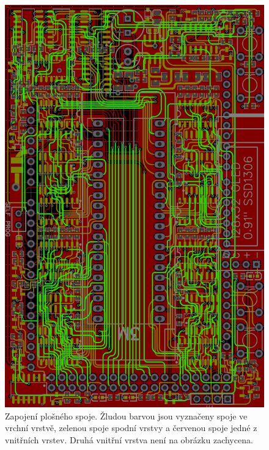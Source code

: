 \documentclass[11pt,a4paper,twoside,openright]{report}
\begin{document}
\begin{figure}[ht!]
  \includegraphics[width=\linewidth]{img/board.png}
  \centering
  \caption{Zapojení plošného spoje. Žludou barvou jsou vyznačeny spoje ve vrchní vrstvě, zelenou spoje spodní vrstvy a červenou spoje jedné z vnitřních vrstev. Druhá vnitřní vrstva není na obrázku zachycena.}
  \label{appendix:board}
\end{figure}
\end{document}
